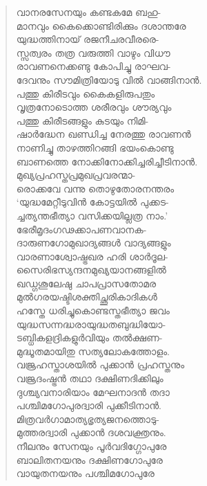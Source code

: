 \begin{verse}
വാനരസേനയും കണ്ടകമേ ബഹു-\\
മാനവും കൈക്കൊണ്ടിരിക്കും ദശാന്തരേ\\
യുദ്ധത്തിനായ് രജനീചരവീരരെ-\\
സ്സത്വരം തത്ര വരുത്തി വാഴും വിധൗ\\
രാവണനെക്കണ്ടു കോപിച്ചു രാഘവ-\\
ദേവനും സൗമിത്രിയോടു വില്‍ വാങ്ങിനാന്‍.\\
പത്തു കിരീടവും കൈകളിരുപതും\\
വൃത്രനോടൊത്ത ശരീരവും ശൗര്യവും\\
പത്തു കിരീടങ്ങളും കുടയും നിമി-\\
ഷാര്‍ദ്ധേന ഖണ്ഡിച്ച നേരത്തു രാവണന്‍\\
നാണിച്ചു താഴത്തിറങ്ങി ഭയംകൊണ്ടു\\
ബാണത്തെ നോക്കിനോക്കിച്ചരിച്ചീടിനാന്‍.\\
മുഖ്യപ്രഹസ്തപ്രമുഖപ്രവരന്മാ-\\
രൊക്കവേ വന്നു തൊഴുതോരനന്തരം\\
‘യുദ്ധമേറ്റീടുവിന്‍ കോട്ടയില്‍ പുക്കട-\\
ച്ചത്യന്തഭീത്യാ വസിക്കയില്ലത്ര നാം.’\\
ഭേരീമൃദംഗഢക്കാപണവാനക-\\
ദാരുണഗോമുഖാദ്യങ്ങള്‍ വാദ്യങ്ങളും\\
വാരണാശ്വോഷ്ട്രഖര ഹരി ശാര്‍ദൂല-\\
സൈരിഭസ്യന്ദനമുഖ്യയാനങ്ങളില്‍\\
ഖഡ്ഗശൂലേഷു ചാപപ്രാസതോമര\\
മുല്‍ഗരയഷ്ടിശക്തിച്ഛുരികാദികള്‍\\
ഹസ്തേ ധരിച്ചുകൊണ്ടസ്തഭീത്യാ ജവം\\
യുദ്ധസന്നദ്ധരായുദ്ധതബുദ്ധിയോ-\\
ടബ്ധികളദ്രികളുര്‍വിയും തല്‍ക്ഷണ-\\
മുദ്ധൂതമായിതു സത്യലോകത്തോളം.\\
വജ്രഹസ്താശയില്‍ പുക്കാന്‍ പ്രഹസ്തനും\\
വജ്രദംഷ്ട്രന്‍ തഥാ ദക്ഷിണദിക്കിലും\\
ദുശ്ച്യവനാരിയാം മേഘനാദന്‍ തദാ\\
പശ്ചിമഗോപുരദ്വാരി പുക്കീടിനാന്‍.\\
മിത്രവര്‍ഗാമാത്യഭൃത്യജനത്തൊടു-\\
മുത്തരദ്വാരി പുക്കാന്‍ ദശവക്ത്രനും.\\
നീലനും സേനയും പൂര്‍വദിഗ്ഗോപുരേ\\
ബാലിതനയനും ദക്ഷിണഗോപുരേ\\
വായുതനയനും പശ്ചിമഗോപുരേ\\

\end{verse}
